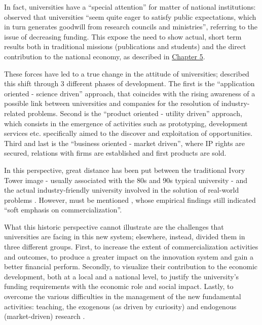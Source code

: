 In fact, universities have a \enquote{special attention} for matter of national institutions: \citet{Rasmussen2006} observed that universities \enquote{seem quite eager to satisfy public expectations, which in turn generates goodwill from research councils and ministries}, referring to the issue of decreasing funding. This expose the need to show actual, short term results both in traditional missions (publications and students) and the direct contribution to the national economy, as described in \hyperref[Chapter5]{Chapter 5}.

These forces have led to a true change in the attitude of universities; \citet{Tijssen2006} described this shift through 3 different phases of development. The first is the \enquote{application oriented - science driven} approach, that coincides with the rising awareness of a possible link between universities and companies for the resolution of industry-related problems. Second is the \enquote{product oriented - utility driven} approach, which consists in the emergence of activities such as prototyping, development services etc. specifically aimed to the discover and exploitation of opportunities. Third and last is the \enquote{business oriented - market driven}, where IP rights are secured, relations with firms are established and first products are sold.

In this perspective, great distance has been put between the traditional Ivory Tower image - usually associated with the 80s and 90s typical university - and the actual industry-friendly university involved in the solution of real-world problems \citep{Baldini2006}. However, must be mentioned \citet{Rasmussen2006}, whose empirical findings still indicated \enquote{soft emphasis on commercialization}.

What this historic perspective cannot illustrate are the challenges that universities are facing in this new system; elsewhere, instead, \citet{Rasmussen2006} divided them in three different groups. First, to increase the extent of commercialization activities and outcomes, to produce a greater impact on the innovation system and gain a better financial perform. Secondly, to visualize their contribution to the economic development, both at a local and a national level, to justify the university's funding requirements with the economic role and social impact. Lastly, to overcome the various difficulties in the management of the new fundamental activities: teaching, the exogenous (as driven by curiosity) and endogenous (market-driven) research \citep{Debackere2005}. 

